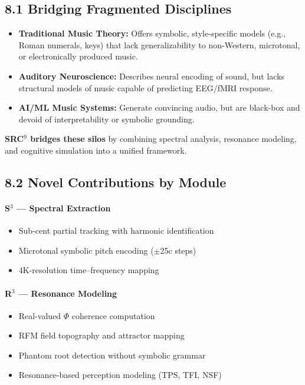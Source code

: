 \documentclass[10pt]{article}
\begin{document}
\subsection*{8.1 Bridging Fragmented Disciplines}

\begin{itemize}
    \item \textbf{Traditional Music Theory:} Offers symbolic, style-specific models (e.g., Roman numerals, keys) that lack generalizability to non-Western, microtonal, or electronically produced music.
    \item \textbf{Auditory Neuroscience:} Describes neural encoding of sound, but lacks structural models of music capable of predicting EEG/fMRI response.
    \item \textbf{AI/ML Music Systems:} Generate convincing audio, but are black-box and devoid of interpretability or symbolic grounding.
\end{itemize}

\textbf{SRC$^{9}$ bridges these silos} by combining spectral analysis, resonance modeling, and cognitive simulation into a unified framework.

\subsection*{8.2 Novel Contributions by Module}

\paragraph{S$^3$ — Spectral Extraction}
\begin{itemize}
    \item Sub-cent partial tracking with harmonic identification
    \item Microtonal symbolic pitch encoding ($\pm$25c steps)
    \item 4K-resolution time–frequency mapping
\end{itemize}

\paragraph{R$^3$ — Resonance Modeling}
\begin{itemize}
    \item Real-valued $\Phi$ coherence computation
    \item RFM field topography and attractor mapping
    \item Phantom root detection without symbolic grammar
    \item Resonance-based perception modeling (TPS, TFI, NSF)
\end{itemize}
\end{document}
